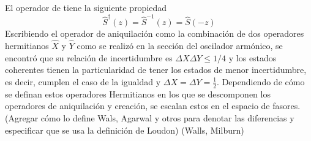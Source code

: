 El operador de tiene la siguiente propiedad
\begin{equation*}
  \hat{S}^{\dagger}(z) = \hat{S}^{-1}(z) = \hat{S}(-z)
\end{equation*}
Escribiendo el operador de aniquilación como la combinación de dos operadores hermitianos $\hat{X}$ y $\hat{Y}$ como se realizó en la sección del oscilador armónico, se encontró que su relación de incertidumbre es $\Delta X \Delta Y \leq 1/4$ y los estados coherentes tienen la particularidad de tener los estados de menor incertidumbre, es decir, cumplen el caso de la igualdad y $\Delta X = \Delta Y = \frac{1}{2}$. Dependiendo de cómo se definan estos operadores Hermitianos en los que se descomponen los operadores de aniquilación y creación, se escalan estos en el espacio de fasores. (Agregar cómo lo define Wals, Agarwal y otros para denotar las diferencias y especificar que se usa la definición de Loudon)
(Walls, Milburn)

